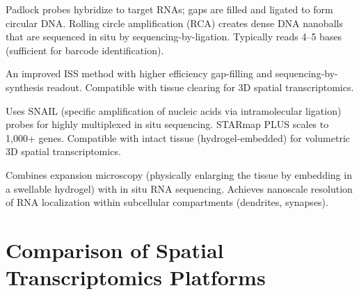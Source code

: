 \begin{description}[style=nextline]
  \item[ISS (In Situ Sequencing)] Padlock probes hybridize to target RNAs;
    gaps are filled and ligated to form circular DNA. Rolling circle
    amplification (RCA) creates dense DNA nanoballs that are sequenced in situ
    by sequencing-by-ligation. Typically reads 4--5 bases (sufficient for
    barcode identification).
  \item[BaristaSeq] An improved ISS method with higher efficiency gap-filling
    and sequencing-by-synthesis readout. Compatible with tissue clearing for
    3D spatial transcriptomics.
  \item[STARmap / STARmap PLUS] Uses SNAIL (specific amplification of nucleic
    acids via intramolecular ligation) probes for highly multiplexed in situ
    sequencing. STARmap PLUS scales to 1,000+ genes. Compatible with intact
    tissue (hydrogel-embedded) for volumetric 3D spatial transcriptomics.
  \item[ExSeq (Expansion Sequencing)] Combines expansion microscopy (physically
    enlarging the tissue by embedding in a swellable hydrogel) with in situ
    RNA sequencing. Achieves nanoscale resolution of RNA localization within
    subcellular compartments (dendrites, synapses).
\end{description}


\section{Comparison of Spatial Transcriptomics Platforms}
\label{sec:spatial:comparison}

